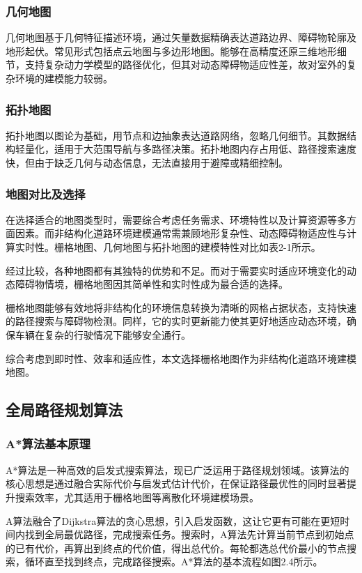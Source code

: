 \documentclass[lettersize,journal]{IEEEtran}
\begin{document}
\subsubsection{几何地图}
几何地图基于几何特征描述环境，通过矢量数据精确表达道路边界、障碍物轮廓及地形起伏。常见形式包括点云地图与多边形地图。能够在高精度还原三维地形细节，支持复杂动力学模型的路径优化，但其对动态障碍物适应性差，故对室外的复杂环境的建模能力较弱。

\subsubsection{拓扑地图}
拓扑地图以图论为基础，用节点和边抽象表达道路网络，忽略几何细节。其数据结构轻量化，适用于大范围导航与多路径决策。拓扑地图内存占用低、路径搜索速度快，但由于缺乏几何与动态信息，无法直接用于避障或精细控制。


\subsubsection{地图对比及选择}
在选择适合的地图类型时，需要综合考虑任务需求、环境特性以及计算资源等多方面因素。而非结构化道路环境建模通常需兼顾地形复杂性、动态障碍物适应性与计算实时性。栅格地图、几何地图与拓扑地图的建模特性对比如表2-1所示。

经过比较，各种地图都有其独特的优势和不足。而对于需要实时适应环境变化的动态障碍物情境，栅格地图因其简单性和实时性成为最合适的选择。

栅格地图能够有效地将非结构化的环境信息转换为清晰的网格占据状态，支持快速的路径搜索与障碍物检测。同样，它的实时更新能力使其更好地适应动态环境，确保车辆在复杂的行驶情况下能够安全通行。

综合考虑到即时性、效率和适应性，本文选择栅格地图作为非结构化道路环境建模地图。

\subsection{全局路径规划算法}


\subsubsection{A*算法基本原理}
A*算法是一种高效的启发式搜索算法，现已广泛运用于路径规划领域。该算法的核心思想是通过融合实际代价与启发式估计代价，在保证路径最优性的同时显著提升搜索效率，尤其适用于栅格地图等离散化环境建模场景。

A算法融合了Dijkstra算法的贪心思想，引入启发函数，这让它更有可能在更短时间内找到全局最优路径，完成搜索任务。搜索时，A算法先计算当前节点到初始点的已有代价，再算出到终点的代价值，得出总代价。每轮都选总代价最小的节点搜索，循环直至找到终点，完成路径搜索。A*算法的基本流程如图2.4所示。
\end{document}
